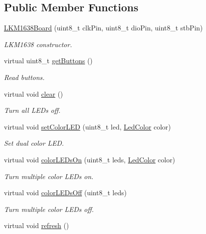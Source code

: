 \subsection*{Public Member Functions}
\begin{DoxyCompactItemize}
\item 
\hyperlink{class_l_k_m1638_board_a8526eb1bc413de3ea12c78b79d5d4bef}{L\+K\+M1638\+Board} (uint8\+\_\+t clk\+Pin, uint8\+\_\+t dio\+Pin, uint8\+\_\+t stb\+Pin)
\begin{DoxyCompactList}\small\item\em L\+K\+M1638 constructor. \end{DoxyCompactList}\item 
virtual uint8\+\_\+t \hyperlink{class_l_k_m1638_board_a46b3777daa6d86b5a0e871fb99604898}{get\+Buttons} ()
\begin{DoxyCompactList}\small\item\em Read buttons. \end{DoxyCompactList}\item 
virtual void \hyperlink{class_l_k_m1638_board_a487398df6c28769e87f20ea51e1395ee}{clear} ()\hypertarget{class_l_k_m1638_board_a487398df6c28769e87f20ea51e1395ee}{}\label{class_l_k_m1638_board_a487398df6c28769e87f20ea51e1395ee}

\begin{DoxyCompactList}\small\item\em Turn all L\+ED\textquotesingle{}s off. \end{DoxyCompactList}\item 
virtual void \hyperlink{class_l_k_m1638_board_a58ee1bc95f31491e1e3d1bd67a85ca07}{set\+Color\+L\+ED} (uint8\+\_\+t led, \hyperlink{_l_k_m1638_board_8h_a81ea3de5b76240d46410f8b9acf4cbde}{Led\+Color} color)
\begin{DoxyCompactList}\small\item\em Set dual color L\+ED. \end{DoxyCompactList}\item 
virtual void \hyperlink{class_l_k_m1638_board_a9c563169a60f4010b89449dce438ccb7}{color\+L\+E\+Ds\+On} (uint8\+\_\+t leds, \hyperlink{_l_k_m1638_board_8h_a81ea3de5b76240d46410f8b9acf4cbde}{Led\+Color} color)
\begin{DoxyCompactList}\small\item\em Turn multiple color L\+ED\textquotesingle{}s on. \end{DoxyCompactList}\item 
virtual void \hyperlink{class_l_k_m1638_board_abf401ad1fa384a03732ed6e6d558ba2b}{color\+L\+E\+Ds\+Off} (uint8\+\_\+t leds)
\begin{DoxyCompactList}\small\item\em Turn multiple color L\+ED\textquotesingle{}s off. \end{DoxyCompactList}\item 
virtual void \hyperlink{class_l_k_m1638_board_affcd16cf2844a7596f08251fab8e0d40}{refresh} ()\hypertarget{class_l_k_m1638_board_affcd16cf2844a7596f08251fab8e0d40}{}\label{class_l_k_m1638_board_affcd16cf2844a7596f08251fab8e0d40}


\end{DoxyCompactItemize}
